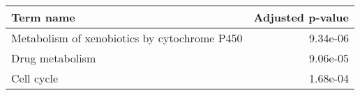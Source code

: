 \begin{tabular}{lr}
\toprule
                                   Term name &  Adjusted p-value \\
\midrule
Metabolism of xenobiotics by cytochrome P450 &          9.34e-06 \\
                             Drug metabolism &          9.06e-05 \\
                                  Cell cycle &          1.68e-04 \\
\bottomrule
\end{tabular}
